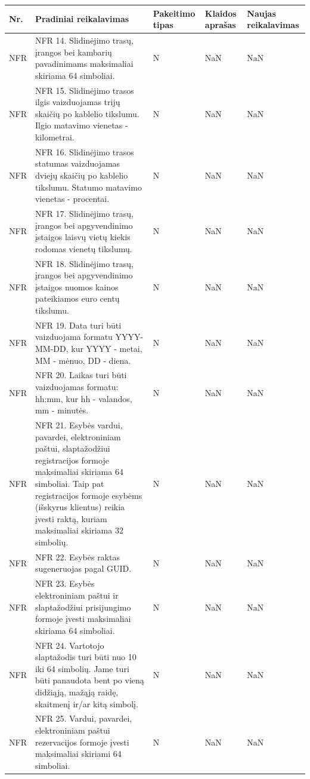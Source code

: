 \documentclass[oneside]{VUMIFPSkursinis}
\begin{document}
\begin{longtable}{ | p{}|p{}|p{}|p{}|p{}| }  \hline

Nr. & Pradiniai reikalavimas&  Pakeitimo tipas & Klaidos aprašas  & Naujas reikalavimas \\ \hline

NFR & NFR 14. Slidinėjimo trasų, įrangos bei kambarių pavadinimams maksimaliai skiriama 64 simboliai. & N & NaN & NaN \\ \hline
NFR & NFR 15. Slidinėjimo trasos ilgis vaizduojamas trijų skaičių po kablelio tikslumu. Ilgio matavimo vienetas - kilometrai.  & N & NaN & NaN \\ \hline
NFR & NFR 16. Slidinėjimo trasos statumas vaizduojamas dviejų skaičių po kablelio tikslumu. Statumo matavimo vienetas - procentai. & N & NaN & NaN \\ \hline
NFR & NFR 17. Slidinėjimo trasų, įrangos bei apgyvendinimo įstaigos laisvų vietų kiekis rodomas vienetų tikslumų. & N & NaN & NaN \\ \hline
NFR & NFR 18. Slidinėjimo trasų, įrangos bei apgyvendinimo įstaigos nuomos kainos pateikiamos euro centų tikslumu. & N & NaN & NaN \\ \hline
NFR & NFR 19. Data turi būti vaizduojama formatu YYYY-MM-DD, kur YYYY - metai, MM - mėnuo, DD - diena. & N & NaN & NaN \\ \hline
NFR & NFR 20. Laikas turi būti vaizduojamas formatu: hh:mm, kur hh - valandos, mm - minutės. & N & NaN & NaN \\ \hline
NFR & NFR 21. Esybės vardui, pavardei, elektroniniam paštui, slaptažodžiui registracijos formoje maksimaliai skiriama 64 simboliai. Taip pat registracijos formoje 
esybėms (išskyrus klientus) reikia įvesti raktą, kuriam maksimaliai skiriama 32 simbolių. & N & NaN & NaN \\ \hline
NFR & NFR 22. Esybės raktas sugeneruojas pagal GUID. & N & NaN & NaN \\ \hline
NFR & NFR 23. Esybės elektroniniam paštui ir slaptažodžiui prisijungimo formoje įvesti maksimaliai skiriama 64 simboliai. & N & NaN & NaN \\ \hline
NFR & NFR 24. Vartotojo slaptažodis turi būti nuo 10 iki 64 simbolių. Jame turi būti panaudota bent po vieną didžiąją, mažąją raidę, skaitmenį ir/ar kitą simbolį. & N & NaN & NaN \\ \hline
NFR & NFR 25. Vardui, pavardei, elektroniniam paštui rezervacijos formoje įvesti maksimaliai skiriami 64 simboliai. & N & NaN & NaN \\ \hline

\end{longtable}
\end{document}
